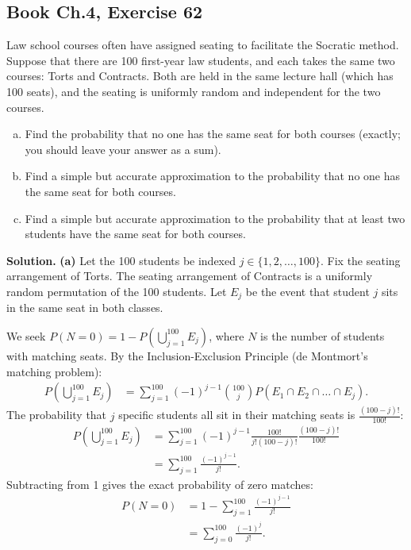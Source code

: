 \documentclass[11pt,a4paper]{article}
\begin{document}
\subsection{Book Ch.4, Exercise 62}
\begin{tcolorbox}[title={Book Ch.4, Exercise 62}]
Law school courses often have assigned seating to facilitate the Socratic method. Suppose that there are 100 first-year law students, and each takes the same two courses: Torts and Contracts. Both are held in the same lecture hall (which has 100 seats), and the seating is uniformly random and independent for the two courses.
\begin{enumerate}[(a)]
\item Find the probability that no one has the same seat for both courses (exactly; you should leave your answer as a sum).
\item Find a simple but accurate approximation to the probability that no one has the same seat for both courses.
\item Find a simple but accurate approximation to the probability that at least two students have the same seat for both courses.
\end{enumerate}
\end{tcolorbox}

\noindent \textbf{Solution.} \textbf{(a)} Let the 100 students be indexed $j \in \{1, 2, \dots, 100\}$. Fix the seating arrangement of Torts. The seating arrangement of Contracts is a uniformly random permutation of the 100 students. Let $E_j$ be the event that student $j$ sits in the same seat in both classes. 

We seek $P(N = 0) = 1 - P\left(\bigcup_{j=1}^{100} E_j\right)$, where $N$ is the number of students with matching seats. By the Inclusion-Exclusion Principle (de Montmort's matching problem):
\begin{align*}
P\left(\bigcup_{j=1}^{100} E_j\right) &= \sum_{j=1}^{100} (-1)^{j-1} \binom{100}{j} P(E_1 \cap E_2 \cap \dots \cap E_j).
\end{align*}
The probability that $j$ specific students all sit in their matching seats is $\frac{(100 - j)!}{100!}$:
\begin{align*}
P\left(\bigcup_{j=1}^{100} E_j\right) &= \sum_{j=1}^{100} (-1)^{j-1} \frac{100!}{j!(100-j)!} \frac{(100-j)!}{100!} \\
&= \sum_{j=1}^{100} \frac{(-1)^{j-1}}{j!}.
\end{align*}
Subtracting from 1 gives the exact probability of zero matches:
\begin{align*}
P(N = 0) &= 1 - \sum_{j=1}^{100} \frac{(-1)^{j-1}}{j!} \\
&= \sum_{j=0}^{100} \frac{(-1)^j}{j!}.
\end{align*}
\end{document}
